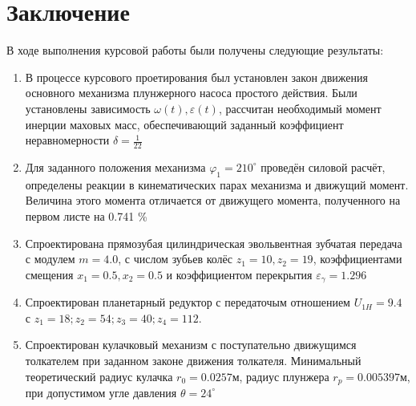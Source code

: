 \section*{Заключение}

В ходе выполнения курсовой работы были получены следующие результаты:

\begin{enumerate}
	\item В процессе курсового проетирования был установлен закон движения основного механизма плунжерного насоса простого действия. Были установлены зависимость $\omega(t), \varepsilon(t)$, рассчитан необходимый момент инерции маховых масс, обеспечивающий заданный коэффициент неравномерности $\delta = \frac{1}{22}$
	
	\item Для заданного положения механизма $\varphi_1 = 210^{\circ}$ проведён силовой расчёт, определены реакции в кинематических парах механизма и движущий момент. Величина этого момента отличается от движущего момента, полученного на первом листе на 0.741 \%
	
	\item Спроектирована прямозубая цилиндрическая эвольвентная зубчатая передача с модулем $m = 4.0$, с числом зубьев колёс $z_1 = 10, z_2 = 19$, коэффициентами смещения $x_1 = 0.5, x_2 = 0.5$ и коэффициентом перекрытия $\varepsilon_{\gamma} = 1.296$
	
	\item Спроектирован планетарный редуктор с передаточым отношением $U_{1H} = 9.4$ с $z_1 = 18; z_2 = 54; z_3 = 40; z_4 = 112$.
	
	\item Спроектирован кулачковый механизм с поступательно движущимся толкателем при заданном законе движения толкателя. Минимальный теоретический радиус кулачка $r_0 = 0.0257 м$, радиус плунжера $r_{p} = 0.005397 м$, при допустимом угле давления $\theta = 24^{\circ}$
\end{enumerate}